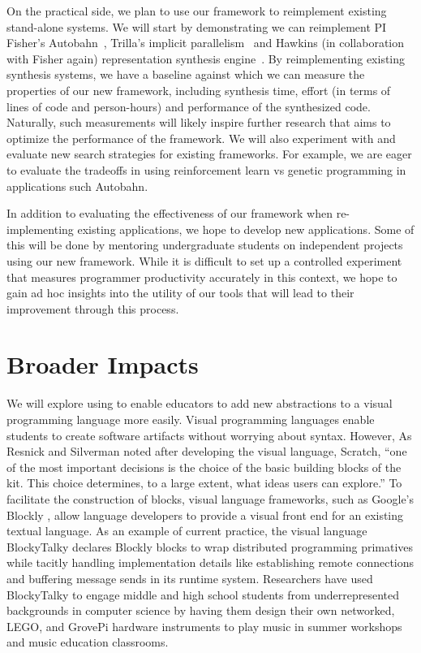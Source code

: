 On the practical side, we plan to use our framework to reimplement
existing stand-alone systems.  We will start by demonstrating we can
reimplement PI Fisher's Autobahn~\cite{autobahn}, Trilla's implicit 
parallelism~\cite{implicit-parallel} and Hawkins (in collaboration with
Fisher again) representation synthesis engine~\cite{implicit-parallel}.  
By reimplementing existing synthesis
systems, we have a baseline against which we can measure the properties
of our new framework, including synthesis time, effort (in terms of lines
of code and person-hours) and performance of the synthesized code.  Naturally,
such measurements will likely inspire further research that aims to
optimize the performance of the framework.   We will also experiment
with and evaluate new search strategies for existing frameworks.  For
example, we are eager to evaluate the tradeoffs in using reinforcement
learn vs genetic programming in applications such Autobahn.

In addition to evaluating the effectiveness of our framework when
re-implementing existing applications, we hope to develop new
applications.  Some of this will be done by mentoring undergraduate
students on independent projects using our new framework.  While it is
difficult to set up a controlled experiment that measures programmer
productivity accurately in this context, we hope to gain ad hoc
insights into the utility of our tools that will lead to their improvement 
through this process.

\section{Broader Impacts}
\label{sec:impact}




We will explore using \rasps to enable educators to add new
abstractions to a visual programming language more easily. Visual programming
languages enable students to create software artifacts without
worrying about syntax.
However, As Resnick and Silverman noted after developing the visual language,
Scratch\cite{Scratch}, ``one of the most important
decisions is the choice of the basic building blocks of the
kit. This choice determines, to a large extent, what ideas
users can explore.'' 
To facilitate the construction of blocks,
visual language frameworks, such
as Google's Blockly \cite{Blocks,BlocklyApps}, allow language
developers to
provide a visual front end for an existing textual language.
As an example of current practice, the visual
language BlockyTalky\cite{BlockyTalky} declares Blockly blocks to wrap distributed
programming primatives while tacitly handling implementation details like establishing
remote connections and buffering message sends in its runtime system.
Researchers have used BlockyTalky to engage middle and high school students
from underrepresented backgrounds in computer science by having them
design their own networked, LEGO, and GrovePi hardware instruments to play music
in summer workshops and music education classrooms.

